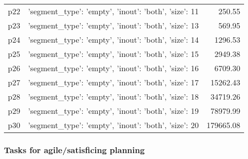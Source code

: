 \documentclass{article}
\begin{document}
\begin{center}
\begin{tabular}{@{}l|r|r@{}}
  p22&{'segment\_type': 'empty', 'inout': 'both', 'size': 11}&250.55\\
  p23&{'segment\_type': 'empty', 'inout': 'both', 'size': 13}&569.95\\
  p24&{'segment\_type': 'empty', 'inout': 'both', 'size': 14}&1296.53\\
  p25&{'segment\_type': 'empty', 'inout': 'both', 'size': 15}&2949.38\\
  p26&{'segment\_type': 'empty', 'inout': 'both', 'size': 16}&6709.30\\
  p27&{'segment\_type': 'empty', 'inout': 'both', 'size': 17}&15262.43\\
  p28&{'segment\_type': 'empty', 'inout': 'both', 'size': 18}&34719.26\\
  p29&{'segment\_type': 'empty', 'inout': 'both', 'size': 19}&78979.99\\
  p30&{'segment\_type': 'empty', 'inout': 'both', 'size': 20}&179665.08
                            \end{tabular}
                            \end{center}
                    

                                \subsubsection*{Tasks for agile/satisficing planning}
                                
\end{document}
